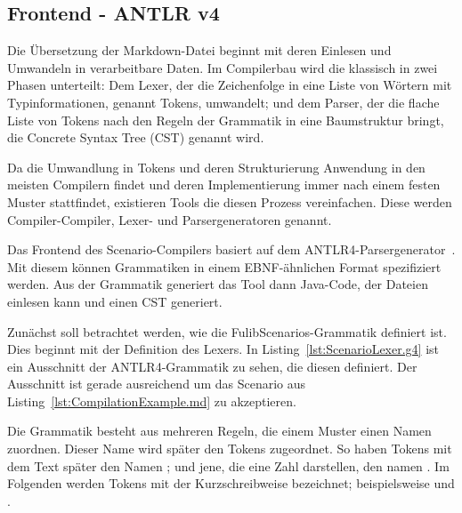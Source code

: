 \subsection{Frontend - ANTLR v4}\label{subsec:frontend-antlr4}

Die Übersetzung der Markdown-Datei beginnt mit deren Einlesen und Umwandeln in verarbeitbare Daten.
Im Compilerbau wird die klassisch in zwei Phasen unterteilt:
Dem Lexer, der die Zeichenfolge in eine Liste von Wörtern mit Typinformationen, genannt Tokens, umwandelt;
und dem Parser, der die flache Liste von Tokens nach den Regeln der Grammatik in eine Baumstruktur bringt,
die Concrete Syntax Tree (CST) genannt wird.

Da die Umwandlung in Tokens und deren Strukturierung Anwendung in den meisten Compilern findet
und deren Implementierung immer nach einem festen Muster stattfindet,
existieren Tools die diesen Prozess vereinfachen.
Diese werden Compiler-Compiler, Lexer- und Parsergeneratoren genannt.

Das Frontend des Scenario-Compilers basiert auf dem ANTLR4-Parsergenerator~\cite{antlr4-reference}.
Mit diesem können Grammatiken in einem EBNF-ähnlichen Format spezifiziert werden.
Aus der Grammatik generiert das Tool dann Java-Code, der Dateien einlesen kann und einen CST generiert.

Zunächst soll betrachtet werden, wie die FulibScenarios-Grammatik definiert ist.
Dies beginnt mit der Definition des Lexers.
In Listing~\ref{lst:ScenarioLexer.g4} ist ein Ausschnitt der ANTLR4-Grammatik zu sehen, die diesen definiert.
Der Ausschnitt ist gerade ausreichend um das Scenario aus Listing~\ref{lst:CompilationExample.md} zu akzeptieren.


Die Grammatik besteht aus mehreren Regeln, die einem Muster einen Namen zuordnen.
Dieser Name wird später den Tokens zugeordnet.
So haben Tokens mit dem Text  später den Namen ;
und jene, die eine Zahl darstellen, den namen .
Im Folgenden werden Tokens mit der Kurzschreibweise  bezeichnet;
beispielsweise  und .

